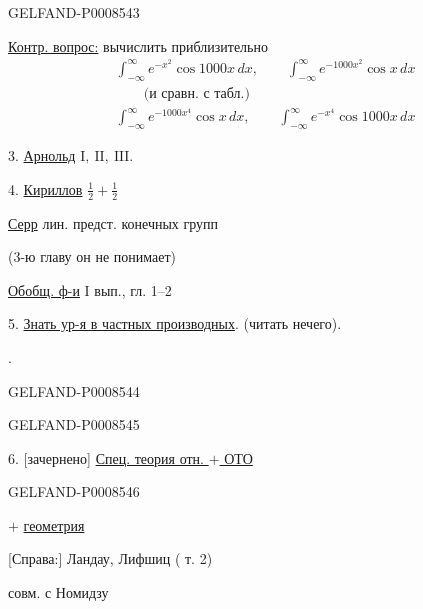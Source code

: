\begin{GelfandAdjacentEvidence}{GELFAND-P000854}{3}


\uline{Контр. вопрос:} вычислить приблизительно
\[
\begin{aligned}
&\int_{-\infty}^{\infty} e^{-x^2}\cos 1000x\,dx,\qquad
 \int_{-\infty}^{\infty} e^{-1000x^2}\cos x\,dx\\
&\qquad\text{(и сравн. с табл.)}\\[.3em]
&\int_{-\infty}^{\infty} e^{-1000x^4}\cos x\,dx,\qquad
 \int_{-\infty}^{\infty} e^{-x^4}\cos 1000x\,dx
\end{aligned}
\]

3. \uline{Арнольд} \(\mathrm{I},\ \mathrm{II},\ \mathrm{III}.\)

4. \uline{Кириллов} \(\tfrac12+\tfrac12\)

\uline{Серр} лин. предст. конечных групп

(3-ю главу он не понимает)

\uline{Обобщ. ф-и} \(\mathrm{I}\) вып., гл. 1–2

5. \uline{Знать ур-я в частных производных}. (читать нечего).


.
\end{GelfandAdjacentEvidence}
\begin{GelfandAdjacentEvidence}{GELFAND-P000854}{4}

\end{GelfandAdjacentEvidence}
\begin{GelfandAdjacentEvidence}{GELFAND-P000854}{5}


6. [зачернено] \uline{Спец. теория отн. \(+\) ОТО}
\end{GelfandAdjacentEvidence}
\begin{GelfandAdjacentEvidence}{GELFAND-P000854}{6}


\(+\) \uline{геометрия}

[Справа:] Ландау, Лифшиц ( т. 2)

совм. с Номидзу
\end{GelfandAdjacentEvidence}
